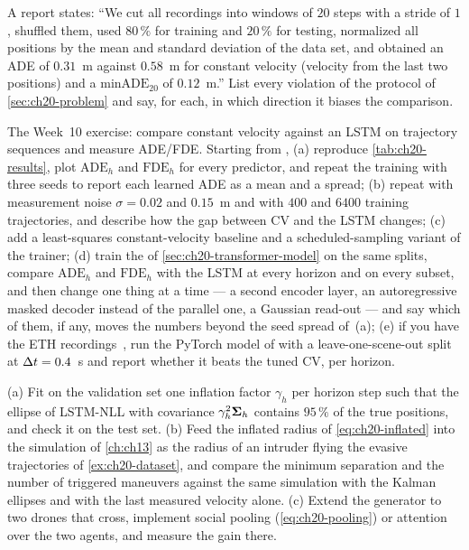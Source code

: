 \begin{exercise}[\difficulty{1}]
\label{exr:ch20-protocol}
A report states: ``We cut all recordings into windows of $20$ steps with a
stride of $1$, shuffled them, used $80\,\%$ for training and $20\,\%$ for
testing, normalized all positions by the mean and standard deviation of the
data set, and obtained an ADE of $0.31$~m against $0.58$~m for constant
velocity (velocity from the last two positions) and a $\mathrm{minADE}_{20}$
of $0.12$~m.'' List every violation of the protocol of
\cref{sec:ch20-problem} and say, for each, in which direction it biases the
comparison.
\end{exercise}

\begin{exercise}
\label{exr:ch20-coding}
The Week~10 exercise: compare constant velocity against an LSTM on
trajectory sequences and measure ADE/FDE. Starting from
, (a) reproduce \cref{tab:ch20-results}, plot
$\mathrm{ADE}_h$ and $\mathrm{FDE}_h$ for every predictor, and repeat the
training with three seeds to report each learned ADE as a mean and a spread; (b) repeat with
measurement noise $\sigma = 0.02$ and $0.15$~m and with $400$ and $6400$
training trajectories, and describe how the gap between CV and the LSTM
changes; (c) add a least-squares constant-velocity baseline and a
scheduled-sampling variant of the trainer; (d) train the
 of \cref{sec:ch20-transformer-model} on the same
splits, compare $\mathrm{ADE}_h$ and $\mathrm{FDE}_h$ with the LSTM at every
horizon and on every subset, and then change one thing at a time --- a second
encoder layer, an autoregressive masked decoder instead of the parallel one,
a Gaussian read-out --- and say which of them, if any, moves the numbers
beyond the seed spread of~(a); (e) if you have the ETH
recordings~\cite{pellegrini2009you}, run the PyTorch model of
 with a leave-one-scene-out split at
$\Delta t = 0.4$~s and
report whether it beats the tuned CV, per horizon.
\end{exercise}

\begin{exercise}
\label{exr:ch20-calibration}
(a) Fit on the validation set one inflation factor $\gamma_h$ per horizon
step such that the ellipse of LSTM-NLL with covariance
$\gamma_h^2\mathbf{\Sigma}_h$ contains $95\,\%$ of the true positions, and check
it on the test set. (b) Feed the inflated radius of
\cref{eq:ch20-inflated} into the \orca simulation of \cref{ch:ch13} as the
radius of an intruder flying the evasive trajectories of
\cref{ex:ch20-dataset}, and compare the minimum separation and the number of
triggered maneuvers against the same simulation with the Kalman ellipses and
with the last measured velocity alone. (c) Extend the generator to two drones
that cross, implement social pooling (\cref{eq:ch20-pooling}) or attention
over the two agents, and measure the gain there.
\end{exercise}
